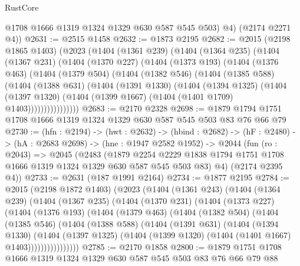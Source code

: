 \begin{lexlean}{RustCore}
\begin{coremodule}
          @1708
          @1666
          @1319
          @1324
          @1329
          @630
          @587
          @545
          @503)
        @4)
      (@2174 @2271 @4))
@2631 := @2515 @1458
@2632 := @1873 @2195
@2682 := @2015
    (@2198 @1865 @1403)
    (@2023
      (@1404
        (@1361 @239)
        (@1404
          (@1364 @235)
          (@1404
            (@1367 @231)
            (@1404
              (@1370 @227)
              (@1404
                (@1373 @193)
                (@1404
                  (@1376 @463)
                  (@1404
                    (@1379 @504)
                    (@1404
                      (@1382 @546)
                      (@1404
                        (@1385 @588)
                        (@1404
                          (@1388 @631)
                          (@1404
                            (@1391 @1330)
                            (@1404
                              (@1394 @1325)
                              (@1404
                                (@1397 @1320)
                                (@1404 (@1399 @1667) (@1404 (@1401 @1709) @1403))))))))))))))))
@2683 := @2170 @2328
@2698 := @1879 @1794 @1751 @1708 @1666 @1319 @1324 @1329 @630 @587 @545 @503 @83 @76 @66 @79
@2730 := (hfn : @2194) ->
  (hwt : @2632) ->
  (hbind : @2682) ->
  (hF : @2480) ->
  (hA : @2683 @2698) ->
  (hne : @1947 @2582 @1952) ->
  @2044
    (fun (ro : @2043) =>
    @2045
      (@2483
        (@1879 @2254 @2229 @1838 @1794 @1751 @1708 @1666 @1319 @1324 @1329 @630 @587 @545 @503 @83)
        @4)
      (@2174 @2395 @4))
@2733 := @2631 (@187 @1991 @2164)
@2734 := @1877 @2195
@2784 := @2015
    (@2198 @1872 @1403)
    (@2023
      (@1404
        (@1361 @243)
        (@1404
          (@1364 @239)
          (@1404
            (@1367 @235)
            (@1404
              (@1370 @231)
              (@1404
                (@1373 @227)
                (@1404
                  (@1376 @193)
                  (@1404
                    (@1379 @463)
                    (@1404
                      (@1382 @504)
                      (@1404
                        (@1385 @546)
                        (@1404
                          (@1388 @588)
                          (@1404
                            (@1391 @631)
                            (@1404
                              (@1394 @1330)
                              (@1404
                                (@1397 @1325)
                                (@1404 (@1399 @1320) (@1404 (@1401 @1667) @1403))))))))))))))))
@2785 := @2170 @1858
@2800 := @1879 @1751 @1708 @1666 @1319 @1324 @1329 @630 @587 @545 @503 @83 @76 @66 @79 @88

\end{coremodule}
\end{lexlean}
